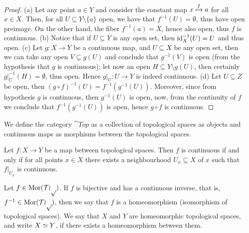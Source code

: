 \begin{proof}
  (a) Let any point \(a \in Y\) and consider the constant map \(x \xmapsto f a\)
  for all \(x \in X\). Then, for all \(U \subseteq Y \setminus \{a\}\) open, we
  have that \(f^{-1}(U) = \emptyset\), thus have open preimage. On the other
  hand, the fiber \(f^{-1}(a) = X\), hence also open, thus \(f\) is continuous.
  (b) Notice that if \(U \subseteq Y\) is any open set, then \(\operatorname{id}_X^{-1}(U) =
  U\) and thus open.
  (c) Let \(g : X \to Y\) be a continuous map, and \(U \subseteq X\) be any open
  set, then we can take any open \(V \subseteq g(U)\) and conclude that
  \(g^{-1}(V)\) is open (from the hypothesis that \(g\) is continuous); let now
  an open \(H \subseteq Y \setminus g(U)\), then certainly \(g|_U^{-1}(H) =
  \emptyset\), thus open. Hence \(g|_U : U \to Y\) is indeed continuous.
  (d) Let \(U \subseteq Z\) be open, then \((g \circ f)^{-1}(U) = f^{-1}
  (g^{-1}(U))\). Moreover, since from hypothesis \(g\) is continuous, then
  \(g^{-1}(U)\) is open, now, from the continuity of \(f\) we conclude that
  \(f^{-1}(g^{-1}(U))\) is open, hence \(g \circ f\) is continuous.
\end{proof}

\begin{definition}
  We define the category \(\cat{Top}\) as a collection of topological spaces as
  objects and continuous maps as morphisms between the topological spaces.
\end{definition}

\begin{proposition}
  \label{prop: local criterion for continuity}
  Let \(f: X \to Y\) be a map between topological spaces. Then \(f\) is
  continuous if and only if for all points \(x \in X\) there exists a
  neighbourhood \(U_x \subseteq X\) of \(x\) such that \(f|_{U_x}\) is
  continuous.
\end{proposition}


\begin{definition}[Homeomorphism]\label{def: homeomorphism}
  Let \(f \in \operatorname{Mor}(\mathcal{Top})\). If \(f\) is bijective and has a continuous
  inverse, that is, \(f^{-1} \in \operatorname{Mor}(\mathcal{Top})\), then we say that \(f\) is a
  homeomorphism (isomorphism of topological spaces). We say that \(X\) and
  \(Y\) are homeomorphic topological spaces, and write \(X \simeq Y\), if there
  exists a homeomorphism between them.
\end{definition}

